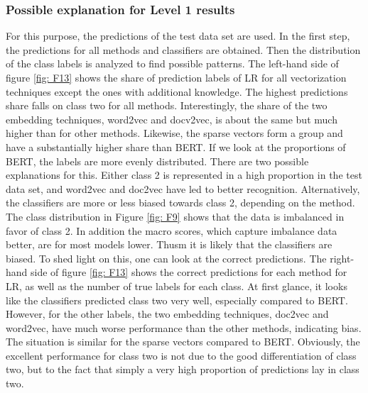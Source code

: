 \documentclass[12pt, a4paper, titlepage]{article}
\begin{document}
\subsubsection*{Possible explanation for Level 1 results}
For this purpose, the predictions of the test data set are used. In the first step, the predictions for all methods and classifiers are obtained. Then the distribution of the class labels is analyzed to find possible patterns. The left-hand side of figure \ref{fig: F13} shows the share of prediction labels of \ac{LR} for all vectorization techniques except the ones with additional knowledge. The highest predictions share falls on class two for all methods.
Interestingly, the share of the two embedding techniques, word2vec and docv2vec, is about the same but much higher than for other methods. Likewise, the sparse vectors form a group and have a substantially higher share than \ac{BERT}. If we look at the proportions of \ac{BERT}, the labels are more evenly distributed. There are two possible explanations for this. Either class 2 is represented in a high proportion in the test data set, and word2vec and doc2vec have led to better recognition. Alternatively, the classifiers are more or less biased towards class 2, depending on the method. The class distribution in Figure \ref{fig: F9} shows that the data is imbalanced in favor of class 2. In addition the macro scores, which capture imbalance data better, are for most models lower. Thusm it is likely that the classifiers are biased. To shed light on this, one can look at the correct predictions. The right-hand side of figure \ref{fig: F13} shows the correct predictions for each method for \ac{LR}, as well as the number of true labels for each class. At first glance, it looks like the classifiers predicted class two very well, especially compared to \ac{BERT}. However, for the other labels, the two embedding techniques, doc2vec and word2vec, have much worse performance than the other methods, indicating bias. The situation is similar for the sparse vectors compared to BERT. Obviously, the excellent performance for class two is not due to the good differentiation of class two, but to the fact that simply a very high proportion of predictions lay in class two. 
\end{document}
